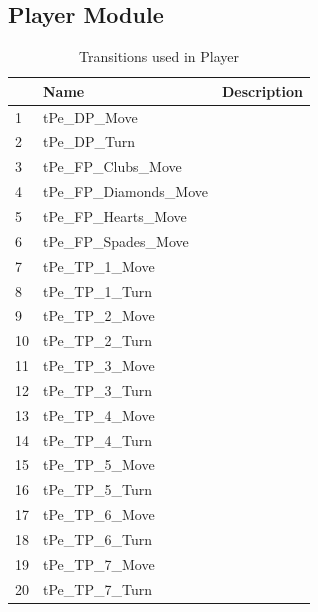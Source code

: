 \documentclass[runningheads,a4paper]{llncs}
\begin{document}
\subsection{Player Module}
\begin{table}
	\caption{Transitions used in Player}
	\begin{tabular}{|l|l|l|}
		\hline
		& Name & Description \\
		\hline
		1 & tPe\_DP\_Move            &    \\ \hline
		2 & tPe\_DP\_Turn            &    \\ \hline
		3 & tPe\_FP\_Clubs\_Move     &    \\ \hline
		4 & tPe\_FP\_Diamonds\_Move  &    \\ \hline
		5 & tPe\_FP\_Hearts\_Move    &    \\ \hline
		6 & tPe\_FP\_Spades\_Move    &    \\ \hline
		7 & tPe\_TP\_1\_Move         &    \\ \hline
		8 & tPe\_TP\_1\_Turn         &    \\ \hline
		9 & tPe\_TP\_2\_Move         &    \\ \hline
		10 & tPe\_TP\_2\_Turn         &    \\ \hline
		11 & tPe\_TP\_3\_Move         &    \\ \hline
		12 & tPe\_TP\_3\_Turn         &    \\ \hline
		13 & tPe\_TP\_4\_Move         &    \\ \hline
		14 & tPe\_TP\_4\_Turn         &    \\ \hline
		15 & tPe\_TP\_5\_Move         &    \\ \hline
		16 & tPe\_TP\_5\_Turn         &    \\ \hline
		17 & tPe\_TP\_6\_Move         &    \\ \hline
		18 & tPe\_TP\_6\_Turn         &    \\ \hline
		19 & tPe\_TP\_7\_Move         &    \\ \hline
		20 & tPe\_TP\_7\_Turn         &    \\ \hline
	\end{tabular}
\end{table}
\clearpage
\end{document}
